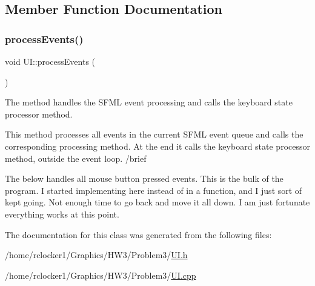 \subsection{Member Function Documentation}
\mbox{\label{class_u_i_a440e133dbf19d82b8b40809644494068}} 
\subsubsection{\texorpdfstring{process\+Events()}{processEvents()}}
{\footnotesize\ttfamily void U\+I\+::process\+Events (\begin{DoxyParamCaption}{ }\end{DoxyParamCaption})}



The method handles the S\+F\+ML event processing and calls the keyboard state processor method. 

This method processes all events in the current S\+F\+ML event queue and calls the corresponding processing method. At the end it calls the keyboard state processor method, outside the event loop. /brief

The below handles all mouse button pressed events. This is the bulk of the program. I started implementing here instead of in a function, and I just sort of kept going. Not enough time to go back and move it all down. I am just fortunate everything works at this point.

The documentation for this class was generated from the following files\+:\begin{DoxyCompactItemize}
\item 
/home/rclocker1/\+Graphics/\+H\+W3/\+Problem3/\hyperlink{_u_i_8h}{U\+I.\+h}\item 
/home/rclocker1/\+Graphics/\+H\+W3/\+Problem3/\hyperlink{_u_i_8cpp}{U\+I.\+cpp}\end{DoxyCompactItemize}
